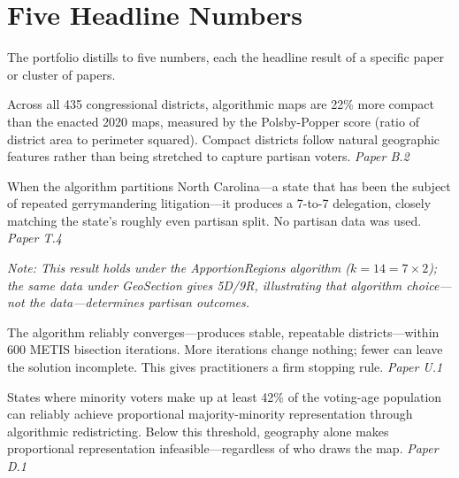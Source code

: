 
\section{Five Headline Numbers}

The portfolio distills to five numbers, each the headline result of
a specific paper or cluster of papers.

\begin{description}[leftmargin=0pt, itemsep=10pt]

  \item[\Large +22\% compactness improvement.]
    Across all 435 congressional districts, algorithmic maps are
    22\% more compact than the enacted 2020 maps, measured by the
    Polsby-Popper score (ratio of district area to perimeter squared).
    Compact districts follow natural geographic features rather than
    being stretched to capture partisan voters.
    \hfill\textit{Paper B.2}~\cite{dellaLibera2026edgeWeighted}

  \item[\Large North Carolina: 7 Democratic, 7 Republican.]
    When the algorithm partitions North Carolina---a state that has
    been the subject of repeated gerrymandering litigation---it
    produces a 7-to-7 delegation, closely matching the state's
    roughly even partisan split.  No partisan data was used.
    \hfill\textit{Paper T.4}~\cite{dellaLibera2026ncRegions}

    \smallskip
    \noindent\textit{Note: This result holds under the ApportionRegions algorithm
    ($k=14=7\times2$); the same data under GeoSection gives 5D/9R, illustrating
    that algorithm choice---not the data---determines partisan outcomes.}

  \item[\Large $T = 600$ bisection steps to convergence.]
    The algorithm reliably converges---produces stable, repeatable
    districts---within 600 METIS bisection iterations.
    More iterations change nothing; fewer can leave the solution
    incomplete.  This gives practitioners a firm stopping rule.
    \hfill\textit{Paper U.1}~\cite{dellaLibera2026convergence}

  \item[\Large 42\% minority-population threshold for VRA compliance.]
    States where minority voters make up at least 42\% of the
    voting-age population can reliably achieve proportional
    majority-minority representation through algorithmic redistricting.
    Below this threshold, geography alone makes proportional
    representation infeasible---regardless of who draws the map.
    \hfill\textit{Paper D.1}~\cite{dellaLibera2026vraCompliance}


\end{description}
